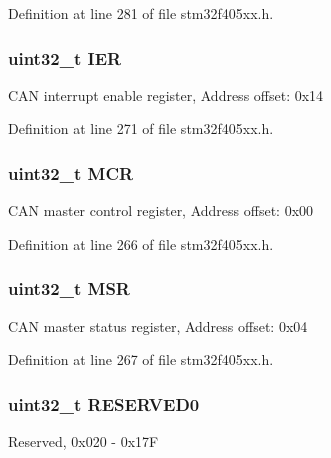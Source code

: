 Definition at line 281 of file stm32f405xx.\+h.

\subsubsection[{\texorpdfstring{I\+ER}{IER}}]{ uint32\+\_\+t I\+ER}\hypertarget{struct_c_a_n___type_def_a6566f8cfbd1d8aa7e8db046aa35e77db}{}\label{struct_c_a_n___type_def_a6566f8cfbd1d8aa7e8db046aa35e77db}
C\+AN interrupt enable register, Address offset\+: 0x14 

Definition at line 271 of file stm32f405xx.\+h.

\subsubsection[{\texorpdfstring{M\+CR}{MCR}}]{ uint32\+\_\+t M\+CR}\hypertarget{struct_c_a_n___type_def_a27af4e9f888f0b7b1e8da7e002d98798}{}\label{struct_c_a_n___type_def_a27af4e9f888f0b7b1e8da7e002d98798}
C\+AN master control register, Address offset\+: 0x00 

Definition at line 266 of file stm32f405xx.\+h.

\subsubsection[{\texorpdfstring{M\+SR}{MSR}}]{ uint32\+\_\+t M\+SR}\hypertarget{struct_c_a_n___type_def_acdd4c1b5466be103fb2bb2a225b1d3a9}{}\label{struct_c_a_n___type_def_acdd4c1b5466be103fb2bb2a225b1d3a9}
C\+AN master status register, Address offset\+: 0x04 

Definition at line 267 of file stm32f405xx.\+h.

\subsubsection[{\texorpdfstring{R\+E\+S\+E\+R\+V\+E\+D0}{RESERVED0}}]{\setlength{\rightskip}{0pt plus 5cm}uint32\+\_\+t R\+E\+S\+E\+R\+V\+E\+D0}\hypertarget{struct_c_a_n___type_def_a563d641ef16f769a56b9683fff35c517}{}\label{struct_c_a_n___type_def_a563d641ef16f769a56b9683fff35c517}
Reserved, 0x020 -\/ 0x17F 

